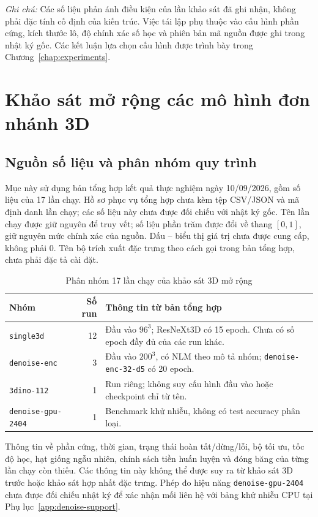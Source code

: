 \documentclass[14pt,a4paper,oneside]{extreport}
\begin{document}
\noindent\textit{Ghi chú:} Các số liệu phản ánh điều kiện của lần
khảo sát đã ghi nhận, không phải đặc tính cố định của kiến trúc.
Việc tái lập phụ thuộc vào cấu hình phần cứng, kích thước lô, độ chính
xác số học và phiên bản mã nguồn được ghi trong nhật ký gốc. Các kết luận
lựa chọn cấu hình được trình bày trong Chương~\ref{chap:experiments}.

\section{Khảo sát mở rộng các mô hình đơn nhánh 3D}
\label{sec:app-3d-expanded}
\subsection{Nguồn số liệu và phân nhóm quy trình}
Mục này sử dụng bản tổng hợp kết quả thực nghiệm ngày 10/09/2026, gồm
số liệu của 17 lần chạy. Hồ sơ phục vụ tổng hợp chưa kèm tệp CSV/JSON
và mã định danh lần chạy; các số liệu này chưa được đối chiếu với nhật ký gốc.
Tên lần chạy được giữ nguyên để truy vết; số liệu phần trăm được đổi về thang $[0,1]$,
giữ nguyên mức chính xác của nguồn.
Dấu -- biểu thị giá trị chưa được cung cấp, không phải 0.
Tên bộ trích xuất đặc trưng theo cách gọi trong bản tổng hợp, chưa phải đặc tả cài đặt.

\begin{table}[htbp]
  \centering
  \caption{Phân nhóm 17 lần chạy của khảo sát 3D mở rộng}
  \label{tab:sweep-3d-protocols}
  \begin{tabular}{@{}>{\RaggedRight\arraybackslash}p{}r>{\RaggedRight\arraybackslash}p{}@{}}
    \toprule Nhóm & Số run & Thông tin từ bản tổng hợp\\ \midrule
    \texttt{single3d} & 12 & Đầu vào $96^3$; ResNeXt3D có 15 epoch. Chưa có số epoch đầy đủ của các run khác.\\
    \texttt{denoise-enc} & 3 & Đầu vào $200^3$, có NLM theo mô tả nhóm; \texttt{denoise-enc-32-d5} có 20 epoch.\\
    \texttt{3dino-112} & 1 & Run riêng; không suy cấu hình đầu vào hoặc checkpoint chỉ từ tên.\\
    \texttt{denoise-gpu-2404} & 1 & Benchmark khử nhiễu, không có test accuracy phân loại.\\
    \bottomrule
  \end{tabular}
\end{table}
Thông tin về phần cứng, thời gian, trạng thái hoàn tất/dừng/lỗi, bộ tối ưu,
tốc độ học, hạt giống ngẫu nhiên, chính sách tiền huấn luyện và đóng băng
của từng lần chạy còn thiếu. Các thông tin này không thể được suy ra từ
khảo sát 3D trước hoặc khảo sát hợp nhất đặc trưng. Phép đo hiệu năng
\texttt{denoise-gpu-2404} chưa được đối chiếu nhật ký để xác nhận mối liên hệ
với bảng khử nhiễu CPU tại Phụ lục~\ref{app:denoise-support}.
\end{document}
